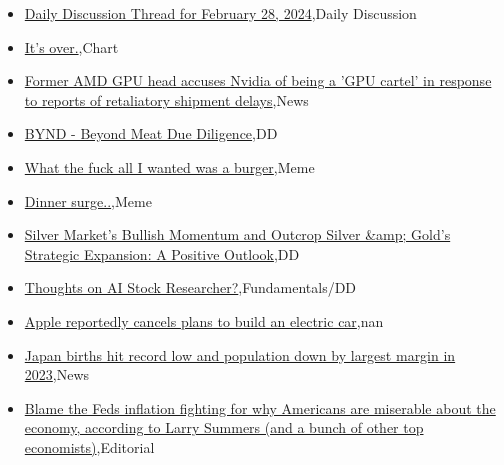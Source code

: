 \documentclass{article}%
\begin{document}
%
\begin{itemize}%
\item%
\href{https://reddit.com/r/wallstreetbets/comments/1b23eip/daily\_discussion\_thread\_for\_february\_28\_2024/}{Daily Discussion Thread for February 28, 2024},Daily Discussion%
\item%
\href{https://reddit.com/r/wallstreetbets/comments/1b231if/its\_over/}{It's over.},Chart%
\item%
\href{https://reddit.com/r/wallstreetbets/comments/1b22ibh/former\_amd\_gpu\_head\_accuses\_nvidia\_of\_being\_a\_gpu/}{Former AMD GPU head accuses Nvidia of being a 'GPU cartel' in response to reports of retaliatory shipment delays},News%
\item%
\href{https://reddit.com/r/wallstreetbets/comments/1b1xd5x/bynd\_beyond\_meat\_due\_diligence/}{BYND - Beyond Meat Due Diligence},DD%
\item%
\href{https://reddit.com/r/wallstreetbets/comments/1b1x6oc/what\_the\_fuck\_all\_i\_wanted\_was\_a\_burger/}{What the fuck all I wanted was a burger},Meme%
\item%
\href{https://reddit.com/r/wallstreetbets/comments/1b1wxha/dinner\_surge/}{Dinner surge..},Meme%
\item%
\href{https://reddit.com/r/Baystreetbets/comments/1b1rhv6/silver\_markets\_bullish\_momentum\_and\_outcrop/}{Silver Market's Bullish Momentum and Outcrop Silver \&amp; Gold's Strategic Expansion: A Positive Outlook},DD%
\item%
\href{https://reddit.com/r/StockMarket/comments/1b1zq6y/thoughts\_on\_ai\_stock\_researcher/}{Thoughts on AI Stock Researcher?},Fundamentals/DD%
\item%
\href{https://reddit.com/r/StockMarket/comments/1b1pjah/apple\_reportedly\_cancels\_plans\_to\_build\_an/}{Apple reportedly cancels plans to build an electric car},nan%
\item%
\href{https://reddit.com/r/Economics/comments/1b1rwqy/japan\_births\_hit\_record\_low\_and\_population\_down/}{Japan births hit record low and population down by largest margin in 2023},News%
\item%
\href{https://reddit.com/r/Economics/comments/1b1rrsx/blame\_the\_feds\_inflation\_fighting\_for\_why/}{Blame the Feds inflation fighting for why Americans are miserable about the economy, according to Larry Summers (and a bunch of other top economists)},Editorial%
\end{itemize}%
\end{document}
